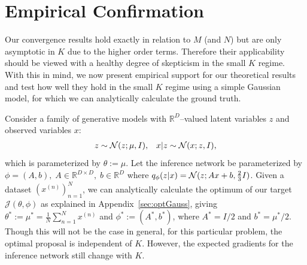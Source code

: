
\section{Empirical Confirmation}
\label{sec:emp}

Our convergence results hold exactly in relation to $M$ (and $N$) but are only 
asymptotic in $K$ due to the higher order terms.  Therefore their applicability should be viewed with a 
healthy degree of skepticism in the small $K$ regime.
 With this in mind, we now present empirical support for our theoretical results 
and test how well they hold in the small $K$ regime
 using a simple Gaussian model, for which we can analytically calculate the ground truth.
 
 Consider a family of generative models with $\mathbb R^D$--valued latent variables $z$ and observed variables $x$:
\begin{align}
    z \sim \mathcal{N}(z;\mu, I), &&
    x \lvert z \sim \mathcal{N}(x; z, I),
\end{align}
which is parameterized by $\theta := \mu$.
Let the inference network be parameterized by $\phi = (A, b), \; A \in \mathbb R^{D \times D}, \; b \in \mathbb R^D$ where $q_{\phi}(z \lvert x) = \mathcal{N}(z; Ax + b, \frac{2}{3}I )$.
Given a dataset $(x^{(n)})_{n = 1}^N$, we can analytically calculate the optimum of our target $\mathcal J(\theta, \phi)$ as explained in Appendix~\ref{sec:optGauss},
giving $\theta^* := \mu^* = \frac{1}{N} \sum_{n = 1}^N x^{(n)}$ and 
$\phi^* := (A^*, b^*)$, where $A^* = I / 2$ and $b^* = \mu^* / 2$. Though this will not be the
case in general, for
this particular problem, the optimal proposal is independent of $K$. 
However, the expected gradients for the inference network still change with $K$.


